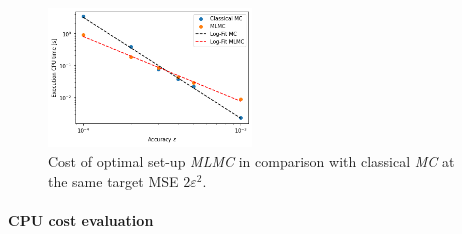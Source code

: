 \begin{figure}
  \begin{center}
    \includegraphics[width=0.48\textwidth]{graphics/d/cpu_cost.png}
  \end{center}
  \caption{Cost of optimal set-up \textit{MLMC} in comparison with classical \textit{MC} at the same target MSE $2\varepsilon^2$.}
    \label{fig:cpu_cost}
\end{figure}

\paragraph{CPU cost evaluation}

